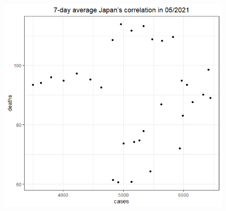 \documentclass[a4paper]{article}
\theoremstyle{definition}
\begin{document}
\begin{enumerate}[1)]
\begin{figure}[H]
\begin{center}
        \includegraphics[scale = 0.3]{ix/ix.3/JPN_05_2021.png}
        

\end{center}
\end{figure}
\end{enumerate}
\end{document}
